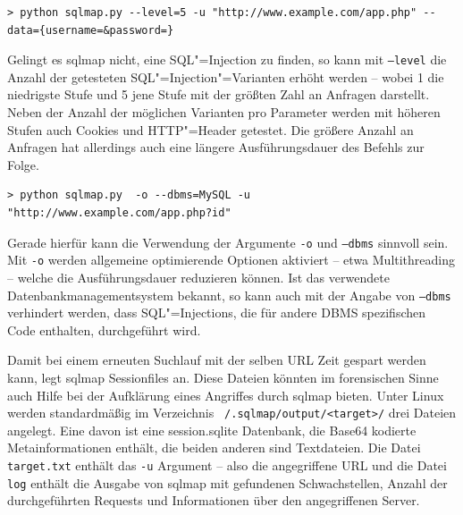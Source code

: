 \begin{listing}[ht!]
\begin{verbatim}
> python sqlmap.py --level=5 -u "http://www.example.com/app.php" --data={username=&password=}
\end{verbatim}
\end{listing}

Gelingt es sqlmap nicht, eine SQL"=Injection zu finden, so kann mit \texttt{--level} die Anzahl der getesteten SQL"=Injection"=Varianten erhöht werden -- wobei 1 die niedrigste Stufe und 5 jene Stufe mit der größten Zahl an Anfragen darstellt. Neben der Anzahl der möglichen Varianten pro Parameter werden mit höheren Stufen auch Cookies und HTTP"=Header getestet. Die größere Anzahl an Anfragen hat allerdings auch eine längere Ausführungsdauer des Befehls zur Folge.

\begin{listing}[ht!]
\begin{verbatim}
> python sqlmap.py  -o --dbms=MySQL -u "http://www.example.com/app.php?id"
\end{verbatim}
\end{listing}

Gerade hierfür kann die Verwendung der Argumente \texttt{-o} und \texttt{--dbms} sinnvoll sein. Mit \texttt{-o} werden allgemeine optimierende Optionen aktiviert -- etwa Multithreading -- welche die Ausführungsdauer reduzieren können. Ist das verwendete Datenbankmanagementsystem bekannt, so kann auch mit der Angabe von \texttt{--dbms} verhindert werden, dass SQL"=Injections, die für andere DBMS spezifischen Code enthalten, durchgeführt wird.


Damit bei einem erneuten Suchlauf mit der selben URL Zeit gespart werden kann, legt sqlmap Sessionfiles an. Diese Dateien könnten im forensischen Sinne auch Hilfe bei der Aufklärung eines Angriffes durch sqlmap bieten. Unter Linux werden standardmäßig im Verzeichnis \texttt{~/.sqlmap/output/<target>/} drei Dateien angelegt. Eine davon ist eine session.sqlite Datenbank, die Base64 kodierte Metainformationen enthält, die beiden anderen sind Textdateien. Die Datei \texttt{target.txt} enthält das \texttt{-u} Argument -- also die angegriffene URL und die Datei \texttt{log} enthält die Ausgabe von sqlmap mit gefundenen Schwachstellen, Anzahl der durchgeführten Requests und Informationen über den angegriffenen Server.

